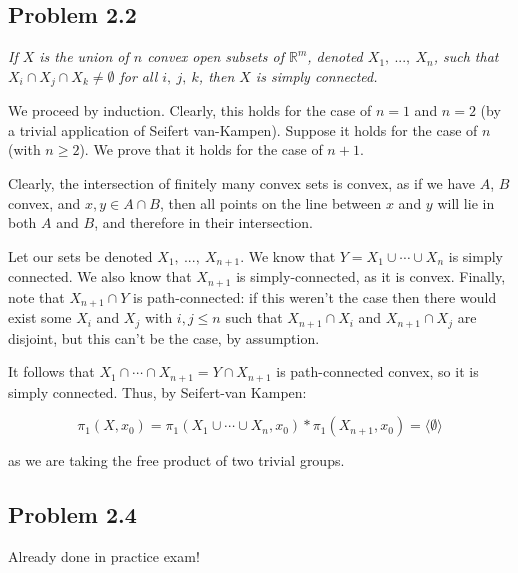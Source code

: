 \documentclass[10pt, oneside]{amsart}
\begin{document}
    \hrulefill

    \subsection{Problem 2.2}

    \textit{If $X$ is the union of $n$ convex open subsets of $\mathbb{R}^{m}$, denoted $X_1, \ ..., \ X_n$, such that $X_i \cap X_j \cap X_k \neq \emptyset$ for all $i, \ j, \ k$,
      then $X$ is simply connected.}
    \newline

    We proceed by induction. Clearly, this holds for the case of $n = 1$ and $n = 2$ (by a trivial application of Seifert van-Kampen). Suppose it holds for the case of $n$ (with $n \geq 2$). We prove
    that it holds for the case of $n + 1$.
    \newline

    Clearly, the intersection of finitely many convex sets is convex, as if we have $A$, $B$ convex, and $x, y \in A \cap B$, then all points on the line between $x$ and $y$ will lie in both
    $A$ and $B$, and therefore in their intersection.
    \newline

    Let our sets be denoted $X_1, \ ..., \ X_{n + 1}$. We know that $Y = X_1 \cup \cdots \cup X_n$ is simply connected. We also know that $X_{n + 1}$ is simply-connected, as
    it is convex. Finally, note that $X_{n + 1} \cap Y$ is path-connected: if this weren't the case then there would exist some $X_{i}$ and $X_{j}$ with $i, j \leq n$ such that
    $X_{n + 1} \cap X_{i}$ and $X_{n + 1} \cap X_{j}$ are disjoint, but this can't be the case, by assumption.
    \newline

    It follows that $X_1 \cap \cdots \cap X_{n + 1} = Y \cap X_{n + 1}$ is path-connected convex, so it is simply connected. Thus, by Seifert-van Kampen:

    $$\pi_1(X, x_0) = \pi_1(X_1 \cup \cdots \cup X_n, x_0) * \pi_1(X_{n + 1}, x_0) = \langle \emptyset \rangle$$

    as we are taking the free product of two trivial groups.

    \hrulefill

    \subsection{Problem 2.4}

    Already done in practice exam!
\end{document}
